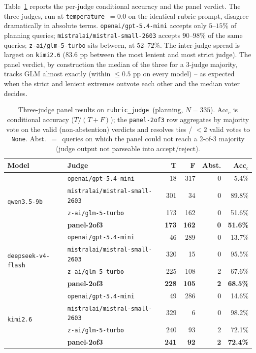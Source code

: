 \documentclass[11pt,a4paper]{article}
\begin{document}
Table~\ref{tab:panelresults} reports the per-judge conditional accuracy and
the panel verdict. The three judges, run at \texttt{temperature}~$=0.0$ on
the identical rubric prompt, disagree dramatically in absolute terms.
\texttt{openai/gpt-5.4-mini} accepts only $5$--$15\%$ of planning queries;
\texttt{mistralai/mistral-small-2603} accepts $90$--$98\%$ of the same
queries; \texttt{z-ai/glm-5-turbo} sits between, at $52$--$72\%$. The
inter-judge spread is largest on \texttt{kimi2.6} ($83.6$ pp between the most
lenient and most strict judge). The panel verdict, by construction the
median of the three for a $3$-judge majority, tracks GLM almost exactly
(within $\le 0.5$ pp on every model) -- as expected when the strict and
lenient extremes outvote each other and the median voter decides.

\begin{table}[ht]
\centering
\caption{Three-judge panel results on \texttt{rubric\_judge}~(planning,
$N{=}335$). Acc$_c$ is conditional accuracy ($T/(T+F)$); the
\texttt{panel-2of3} row aggregates by majority vote on the valid (non-abstention)
verdicts and resolves ties / $<2$ valid votes to \texttt{None}. Abst.~$=$~queries
on which the panel could not reach a 2-of-3 majority (judge output not parseable
into accept/reject).}
\label{tab:panelresults}
\small
\begin{tabular}{l l r r r r}
\toprule
\textbf{Model} & \textbf{Judge} & \textbf{T} & \textbf{F} & \textbf{Abst.} & \textbf{Acc$_c$} \\
\midrule
\multirow{4}{*}{\texttt{qwen3.5-9b}}
 & \texttt{openai/gpt-5.4-mini}            &  18 & 317 & 0 & \phantom{0}5.4\% \\
 & \texttt{mistralai/mistral-small-2603}   & 301 &  34 & 0 & 89.8\% \\
 & \texttt{z-ai/glm-5-turbo}               & 173 & 162 & 0 & 51.6\% \\
 & \textbf{panel-2of3}                     & \textbf{173} & \textbf{162} & \textbf{0} & \textbf{51.6\%} \\
\midrule
\multirow{4}{*}{\texttt{deepseek-v4-flash}}
 & \texttt{openai/gpt-5.4-mini}            &  46 & 289 & 0 & 13.7\% \\
 & \texttt{mistralai/mistral-small-2603}   & 320 &  15 & 0 & 95.5\% \\
 & \texttt{z-ai/glm-5-turbo}               & 225 & 108 & 2 & 67.6\% \\
 & \textbf{panel-2of3}                     & \textbf{228} & \textbf{105} & \textbf{2} & \textbf{68.5\%} \\
\midrule
\multirow{4}{*}{\texttt{kimi2.6}}
 & \texttt{openai/gpt-5.4-mini}            &  49 & 286 & 0 & 14.6\% \\
 & \texttt{mistralai/mistral-small-2603}   & 329 &   6 & 0 & 98.2\% \\
 & \texttt{z-ai/glm-5-turbo}               & 240 &  93 & 2 & 72.1\% \\
 & \textbf{panel-2of3}                     & \textbf{241} & \textbf{\phantom{0}92} & \textbf{2} & \textbf{72.4\%} \\
\bottomrule
\end{tabular}
\end{table}
\end{document}
